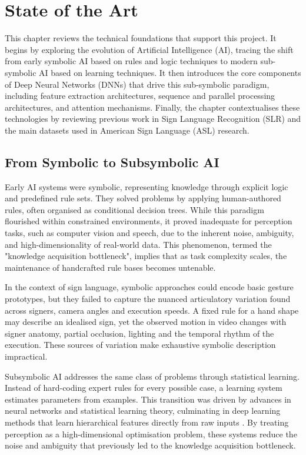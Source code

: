 \chapter{State of the Art}
\label{ch:sota}

This chapter reviews the technical foundations that support this project. It begins by exploring
the evolution of Artificial Intelligence (AI), tracing the shift from early symbolic AI based on
rules and logic techniques to modern sub-symbolic AI based on learning techniques. It then
introduces the core components of Deep Neural Networks (DNNs) that drive this sub-symbolic
paradigm, including feature extraction architectures, sequence and parallel processing
architectures, and attention mechanisms. Finally, the chapter contextualises these technologies by
reviewing previous work in Sign Language Recognition (SLR) and the main datasets used in American
Sign Language (ASL) research.

\section{From Symbolic to Subsymbolic AI}

Early AI systems were symbolic, representing knowledge through explicit logic and predefined rule
sets. They solved problems by applying human-authored rules, often organised as conditional
decision trees. While this paradigm flourished within constrained environments, it proved
inadequate for perception tasks, such as computer vision and speech, due to the inherent noise,
ambiguity, and high-dimensionality of real-world data. This phenomenon, termed the "knowledge
acquisition bottleneck", implies that as task complexity scales, the maintenance of handcrafted
rule bases becomes untenable.

In the context of sign language, symbolic approaches could encode basic gesture prototypes, but
they failed to capture the nuanced articulatory variation found across signers, camera angles and
execution speeds. A fixed rule for a hand shape may describe an idealised sign, yet the observed
motion in video changes with signer anatomy, partial occlusion, lighting and the temporal rhythm of
the execution. These sources of variation make exhaustive symbolic description impractical.

Subsymbolic AI addresses the same class of problems through statistical learning. Instead of
hard-coding expert rules for every possible case, a learning system estimates parameters from
examples. This transition was driven by advances in neural networks and statistical learning
theory, culminating in deep learning methods that learn hierarchical features directly from raw
inputs \cite{lecun2015deeplearning}. By treating perception as a high-dimensional optimisation
problem, these systems reduce the noise and ambiguity that previously led to the knowledge
acquisition bottleneck.

